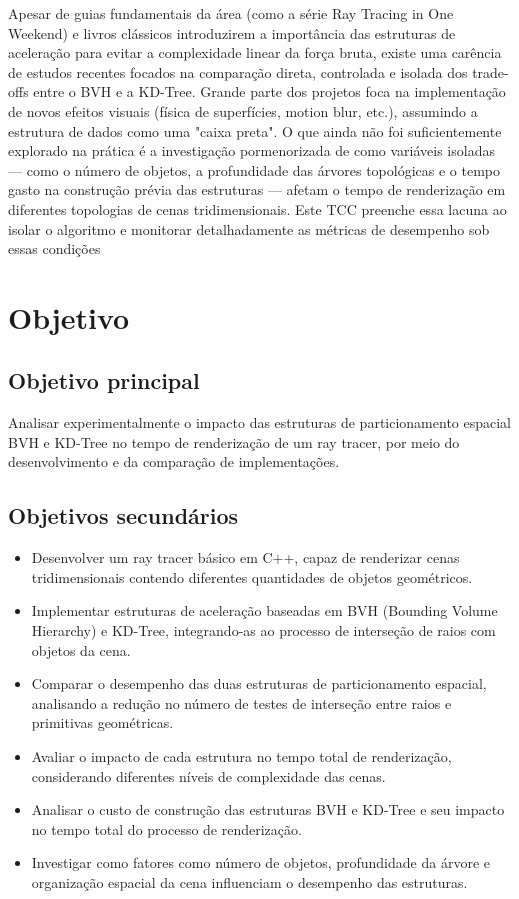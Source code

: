 \documentclass[
    12pt,                %
    openright,           %
    oneside,             %
    a4paper,             %
    english,             %
    brazil               %
]{abntex2}
\begin{document}
Apesar de guias fundamentais da área (como a série Ray Tracing in One Weekend) e livros clássicos introduzirem a importância das estruturas de aceleração para evitar a complexidade linear da força bruta, existe uma carência de estudos recentes focados na comparação direta, controlada e isolada dos trade-offs entre o BVH e a KD-Tree. Grande parte dos projetos foca na implementação de novos efeitos visuais (física de superfícies, motion blur, etc.), assumindo a estrutura de dados como uma "caixa preta". O que ainda não foi suficientemente explorado na prática é a investigação pormenorizada de como variáveis isoladas — como o número de objetos, a profundidade das árvores topológicas e o tempo gasto na construção prévia das estruturas — afetam o tempo de renderização em diferentes topologias de cenas tridimensionais. Este TCC preenche essa lacuna ao isolar o algoritmo e monitorar detalhadamente as métricas de desempenho sob essas condições
\section{Objetivo}
\label{sec:objetivo}

\subsection{Objetivo principal}

Analisar experimentalmente o impacto das estruturas de particionamento espacial BVH e KD-Tree no tempo de renderização de um ray tracer, por meio do desenvolvimento e da comparação de implementações.

\subsection{Objetivos secundários}

\begin{itemize}
    \item Desenvolver um ray tracer básico em C++, capaz de renderizar cenas tridimensionais contendo diferentes quantidades de objetos geométricos.
    \item Implementar estruturas de aceleração baseadas em BVH (Bounding Volume Hierarchy) e KD-Tree, integrando-as ao processo de interseção de raios com objetos da cena.
    \item Comparar o desempenho das duas estruturas de particionamento espacial, analisando a redução no número de testes de interseção entre raios e primitivas geométricas.
    \item Avaliar o impacto de cada estrutura no tempo total de renderização, considerando diferentes níveis de complexidade das cenas.
    \item Analisar o custo de construção das estruturas BVH e KD-Tree e seu impacto no tempo total do processo de renderização.
    \item Investigar como fatores como número de objetos, profundidade da árvore e organização espacial da cena influenciam o desempenho das estruturas.
\end{itemize}
\end{document}
